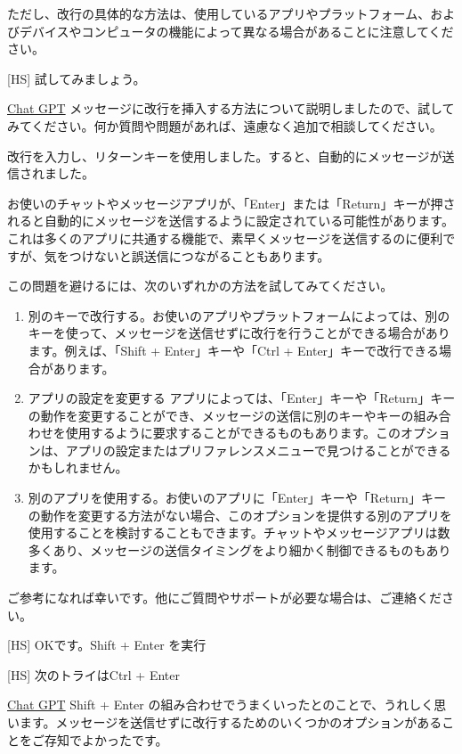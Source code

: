 \documentclass[
]{book}
\theoremstyle{definition}
\theoremstyle{definition}
\theoremstyle{definition}
\theoremstyle{definition}
\theoremstyle{remark}
\begin{document}
ただし、改行の具体的な方法は、使用しているアプリやプラットフォーム、およびデバイスやコンピュータの機能によって異なる場合があることに注意してください。

{[}HS{]} 試してみましょう。

\protect\hyperlink{chatgpt}{Chat GPT} メッセージに改行を挿入する方法について説明しましたので、試してみてください。何か質問や問題があれば、遠慮なく追加で相談してください。

改行を入力し、リターンキーを使用しました。すると、自動的にメッセージが送信されました。

お使いのチャットやメッセージアプリが、「Enter」または「Return」キーが押されると自動的にメッセージを送信するように設定されている可能性があります。これは多くのアプリに共通する機能で、素早くメッセージを送信するのに便利ですが、気をつけないと誤送信につながることもあります。

この問題を避けるには、次のいずれかの方法を試してみてください。

\begin{enumerate}
\def\labelenumi{\arabic{enumi}.}
\item
  別のキーで改行する。お使いのアプリやプラットフォームによっては、別のキーを使って、メッセージを送信せずに改行を行うことができる場合があります。例えば、「Shift + Enter」キーや「Ctrl + Enter」キーで改行できる場合があります。
\item
  アプリの設定を変更する アプリによっては、「Enter」キーや「Return」キーの動作を変更することができ、メッセージの送信に別のキーやキーの組み合わせを使用するように要求することができるものもあります。このオプションは、アプリの設定またはプリファレンスメニューで見つけることができるかもしれません。
\item
  別のアプリを使用する。お使いのアプリに「Enter」キーや「Return」キーの動作を変更する方法がない場合、このオプションを提供する別のアプリを使用することを検討することもできます。チャットやメッセージアプリは数多くあり、メッセージの送信タイミングをより細かく制御できるものもあります。
\end{enumerate}

ご参考になれば幸いです。他にご質問やサポートが必要な場合は、ご連絡ください。

{[}HS{]} OKです。Shift + Enter を実行

{[}HS{]} 次のトライはCtrl + Enter

\protect\hyperlink{chatgpt}{Chat GPT} Shift + Enter の組み合わせでうまくいったとのことで、うれしく思います。メッセージを送信せずに改行するためのいくつかのオプションがあることをご存知でよかったです。
\end{document}
